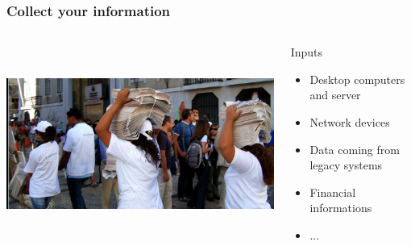 \documentclass{beamer}
\begin{document}
\begin{frame}

    \frametitle{Collect your information}

 \begin{columns}
 \begin{column}{0.34\textwidth}
    \includegraphics[height=6.5cm]{pics/information.jpg}
 \end{column}
 \begin{column}{0.90\textwidth}
    \begin{block}{Inputs}
        \begin{itemize}
            \item Desktop computers and server
            \item Network devices
            \item Data coming from legacy systems
            \item Financial informations
            \item ...
        \end{itemize}
    \end{block}

 \end{column}
\end{columns}


\end{frame}
\end{document}
